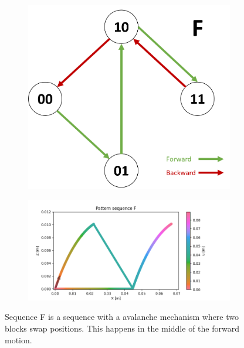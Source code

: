     \begin{figure}[h]
        \centering
        \begin{subfigure}{.2\textwidth}
        \includegraphics[width=\textwidth]{images/S_F.png}
        \end{subfigure}%
        \begin{subfigure}{.6\textwidth}
        \includegraphics[width=\textwidth]{images/F.png}
        \end{subfigure}
        \caption{Sequence F is a sequence with a avalanche mechanism where two blocks swap positions. This happens in the middle of the forward motion.}
        \label{fig:appendix_seq_F}
    \end{figure}
    
